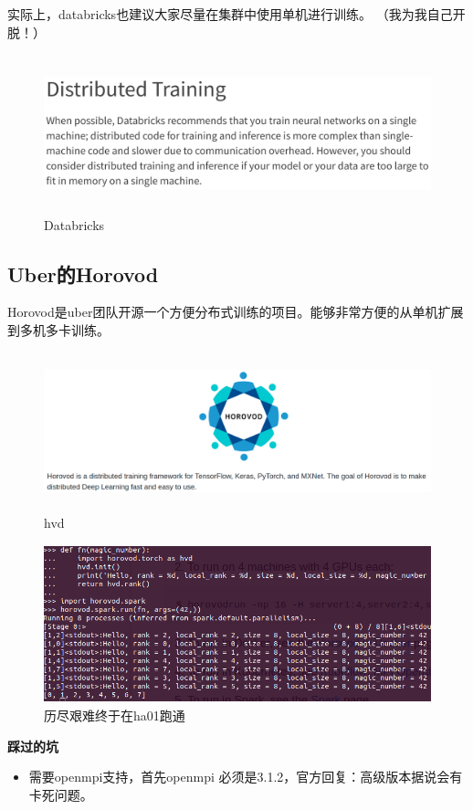 \documentclass[12pt,a4paper,oneside]{article}
\begin{document}
\begin{CJK*}{UTF8}{gbsn}
实际上，databricks也建议大家尽量在集群中使用单机进行训练。 （我为我自己开脱！）
\begin{figure}[H] 
\centering
\includegraphics[width=6in,height=1.8in]{dist1}
\caption{Databricks}
\end{figure}

\subsection{Uber的Horovod}

Horovod是uber团队开源一个方便分布式训练的项目。能够非常方便的从单机扩展到多机多卡训练。
\begin{figure}[H] 
\centering
\includegraphics[width=6in,height=1.8in]{hvd}
\caption{hvd}
\end{figure}

\begin{figure}[H] 
\centering
\includegraphics[width=5in,height=1.8in]{hvd_run}
\caption{历尽艰难终于在ha01跑通}
\end{figure}
\textbf{踩过的坑}
~\\

\begin{itemize}
\item 需要openmpi支持，首先openmpi 必须是3.1.2，官方回复：高级版本据说会有卡死问题。


\end{itemize}
\end{CJK*}
\end{document}
